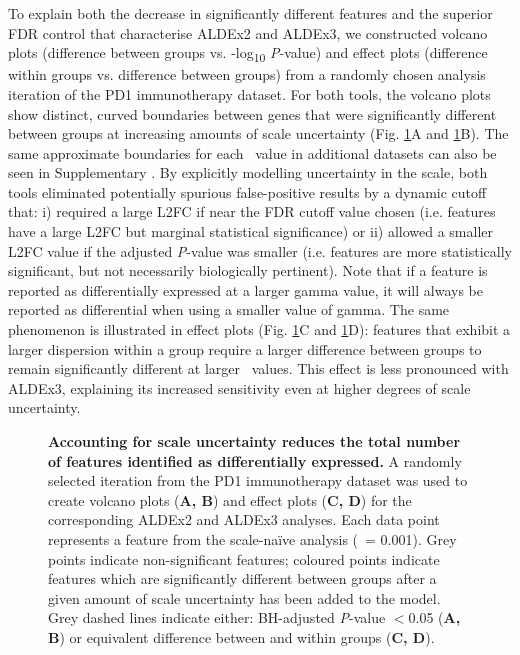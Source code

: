 \documentclass[10pt,letterpaper]{article}
\begin{document}
To explain both the decrease in significantly different features and the superior FDR control that characterise ALDEx2 and ALDEx3, we constructed volcano plots \cite{Cui:2003aa} (difference between groups vs. -log\textsubscript{10} \textit{P}-value) and effect plots \cite{gloor:effect} (difference within groups vs. difference between groups) from a randomly chosen analysis iteration of the PD1 immunotherapy dataset. For both tools, the volcano plots show distinct, curved boundaries between genes that were significantly different between groups at increasing amounts of scale uncertainty (Fig. \ref{fig:volcano}A and \ref{fig:volcano}B). The same approximate boundaries for each \textgamma~value in additional datasets can also be seen in Supplementary . By explicitly modelling uncertainty in the scale, both tools eliminated potentially spurious false-positive results by a dynamic cutoff that: i) required a large L2FC if near the FDR cutoff value chosen (i.e. features have a large L2FC but marginal statistical significance) or ii) allowed a smaller L2FC value if the adjusted \textit{P}-value was smaller (i.e. features are more statistically significant, but not necessarily biologically pertinent). Note that if a feature is reported as differentially expressed at a larger gamma value, it will always be reported as differential when using a smaller value of gamma. The same phenomenon is illustrated in effect plots (Fig. \ref{fig:volcano}C and \ref{fig:volcano}D): features that exhibit a larger dispersion within a group require a larger difference between groups to remain significantly different at larger \textgamma~values. This effect is less pronounced with ALDEx3, explaining its increased sensitivity even at higher degrees of scale uncertainty.

\begin{figure}[H]
    \centering
    \caption{\textbf{Accounting for scale uncertainty reduces the total number of features identified as differentially expressed.} A randomly selected iteration from the PD1 immunotherapy dataset was used to create volcano plots (\textbf{A, B}) and effect plots (\textbf{C, D}) for the corresponding ALDEx2 and ALDEx3 analyses. Each data point represents a feature from the scale-na\"ive analysis (\textgamma~= 0.001). Grey points indicate non-significant features; coloured points indicate features which are significantly different between groups after a given amount of scale uncertainty has been added to the model. Grey dashed lines indicate either: BH-adjusted \textit{P}-value $<$0.05 (\textbf{A, B}) or equivalent difference between and within groups (\textbf{C, D}).}
    \label{fig:volcano}
\end{figure}
\end{document}

